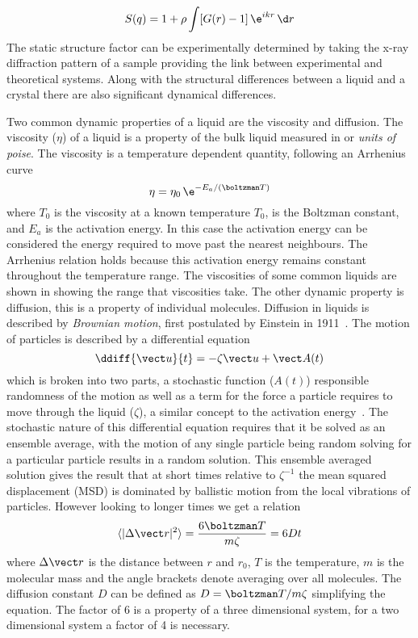 \begin{equation}
    S(q) = 1 + \rho \int [G(r)-1]\,\e^{ikr}\, \d r
\end{equation}
The static structure factor can be experimentally determined by taking the x-ray diffraction pattern of a sample providing the link between experimental and theoretical systems. Along with the structural differences between a liquid and a crystal there are also significant dynamical differences.

\begin{figure}
    \caption{}
    \label{fig:radial distribution}
\end{figure}

Two common dynamic properties of a liquid are the viscosity and diffusion. The viscosity ($\eta$) of a liquid is a property of the bulk liquid measured in \si{\poise} or \emph{units of poise}. The viscosity is a temperature dependent quantity, following an Arrhenius curve
\begin{equation}
    \eta = \eta_0\, \e^{-E_a/(\boltzman T)}
\end{equation}
where $T_0$ is the viscosity at a known temperature $T_0$, \boltzman is the Boltzman constant, and $E_a$ is the activation energy. In this case the activation energy can be considered the energy required to move past the nearest neighbours. The Arrhenius relation holds because this activation energy remains constant throughout the temperature range. The viscosities of some common liquids are shown in \tabref{} showing the range that viscosities take. The other dynamic property is diffusion, this is a property of individual molecules. Diffusion in liquids is described by \emph{Brownian motion}, first postulated by Einstein in 1911~\tocheck. The motion of particles is described by a differential equation 
\begin{equation}
    \ddiff{\vect u}{t} = - \zeta\vect u + \vect A(t)
\end{equation}
which is broken into two parts, a stochastic function ($A(t)$) responsible randomness of the motion as well as a term for the force a particle requires to move through the liquid ($\zeta$), a similar concept to the activation energy~\cite{mcquarrie:76}. The stochastic nature of this differential equation requires that it be solved as an ensemble average, with the motion of any single particle being random solving for a particular particle results in a random solution. This ensemble averaged solution gives the result that at short times relative to $\zeta^{-1}$ the mean squared displacement (MSD) is dominated by ballistic motion from the local vibrations of particles. However looking to longer times we get a relation
\begin{equation}
    \langle |\Delta \vect r|^2 \rangle = \frac{6\boltzman T}{m\zeta} = 6Dt
\end{equation}
where $\Delta \vect r$ is the distance between $r$ and $r_0$, $T$ is the temperature, $m$ is the molecular mass and the angle brackets denote averaging over all molecules. The diffusion constant $D$ can be defined as $D = \boltzman T/m\zeta$ simplifying the equation. The factor of 6 is a property of a three dimensional system, for a two dimensional system a factor of 4 is necessary.


